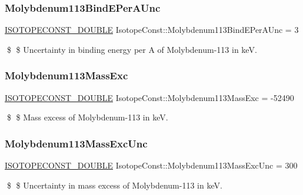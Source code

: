 \subsubsection{\texorpdfstring{Molybdenum113\+Bind\+E\+Per\+A\+Unc}{Molybdenum113BindEPerAUnc}}
{\footnotesize\ttfamily \mbox{\hyperlink{group___isotope_const-_macros_ga8f45a7272ce02c0b4c65c44636ed719a}{I\+S\+O\+T\+O\+P\+E\+C\+O\+N\+S\+T\+\_\+\+D\+O\+U\+B\+LE}} Isotope\+Const\+::\+Molybdenum113\+Bind\+E\+Per\+A\+Unc = 3}

\$ \$ Uncertainty in binding energy per A of Molybdenum-\/113 in keV. \mbox{\label{group___isotope_const-_molybdenum-_mo113_gac91e8a2ec46a66e4d9852d19515a1e29}} 
\subsubsection{\texorpdfstring{Molybdenum113\+Mass\+Exc}{Molybdenum113MassExc}}
{\footnotesize\ttfamily \mbox{\hyperlink{group___isotope_const-_macros_ga8f45a7272ce02c0b4c65c44636ed719a}{I\+S\+O\+T\+O\+P\+E\+C\+O\+N\+S\+T\+\_\+\+D\+O\+U\+B\+LE}} Isotope\+Const\+::\+Molybdenum113\+Mass\+Exc = -\/52490}

\$ \$ Mass excess of Molybdenum-\/113 in keV. \mbox{\label{group___isotope_const-_molybdenum-_mo113_gad9e57d816b350c56bb263bcac7b0c2b1}} 
\subsubsection{\texorpdfstring{Molybdenum113\+Mass\+Exc\+Unc}{Molybdenum113MassExcUnc}}
{\footnotesize\ttfamily \mbox{\hyperlink{group___isotope_const-_macros_ga8f45a7272ce02c0b4c65c44636ed719a}{I\+S\+O\+T\+O\+P\+E\+C\+O\+N\+S\+T\+\_\+\+D\+O\+U\+B\+LE}} Isotope\+Const\+::\+Molybdenum113\+Mass\+Exc\+Unc = 300}

\$ \$ Uncertainty in mass excess of Molybdenum-\/113 in keV. \mbox{\label{group___isotope_const-_molybdenum-_mo113_ga7fcfc7aa741d8b24d88ff98368c3fdf7}} 
